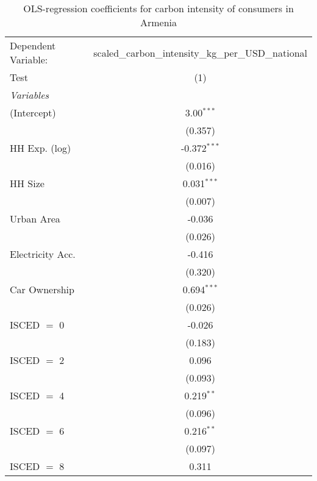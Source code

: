 
\begin{table}[htbp!]
   \centering
   \small
   \begin{adjustbox}{width = 1\textwidth, max height = 0.95\textheight, center}
      \begin{threeparttable}[b]
         \caption{\label{tab:OLS_1_ARM} OLS-regression coefficients for carbon intensity of consumers in Armenia}
         \begin{tabular}{lc}
            \tabularnewline \midrule \midrule
            Dependent Variable: & scaled\_carbon\_intensity\_kg\_per\_USD\_national\\        
            Test                & (1)\\  
            \midrule
            \emph{Variables}\\
            (Intercept)         & 3.00$^{***}$\\   
                                & (0.357)\\   
            HH Exp. (log)       & -0.372$^{***}$\\   
                                & (0.016)\\   
            HH Size             & 0.031$^{***}$\\   
                                & (0.007)\\   
            Urban Area          & -0.036\\   
                                & (0.026)\\   
            Electricity Acc.    & -0.416\\   
                                & (0.320)\\   
            Car Ownership       & 0.694$^{***}$\\   
                                & (0.026)\\   
            ISCED $=$ 0         & -0.026\\   
                                & (0.183)\\   
            ISCED $=$ 2         & 0.096\\   
                                & (0.093)\\   
            ISCED $=$ 4         & 0.219$^{**}$\\   
                                & (0.096)\\   
            ISCED $=$ 6         & 0.216$^{**}$\\   
                                & (0.097)\\   
            ISCED $=$ 8         & 0.311\\   

\end{tabular}
\end{threeparttable}
\end{adjustbox}
\end{table}
